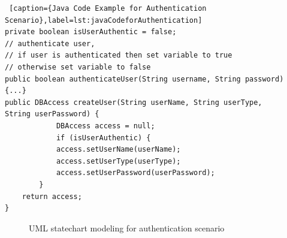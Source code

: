 \begin{lstlisting} [caption={Java Code Example for Authentication Scenario},label=lst:javaCodeforAuthentication]
private boolean isUserAuthentic = false;
// authenticate user,
// if user is authenticated then set variable to true
// otherwise set variable to false
public boolean authenticateUser(String username, String password) {...}
public DBAccess createUser(String userName, String userType,
String userPassword) {
			DBAccess access = null;			
			if (isUserAuthentic) {
			access.setUserName(userName);
			access.setUserType(userType);
			access.setUserPassword(userPassword);
		}
	return access;
}
\end{lstlisting}

\begin{figure}[htbp]
	\centering
	\label{fig:authentication_scenario}
	\caption{UML statechart modeling for authentication scenario}
\end{figure}



